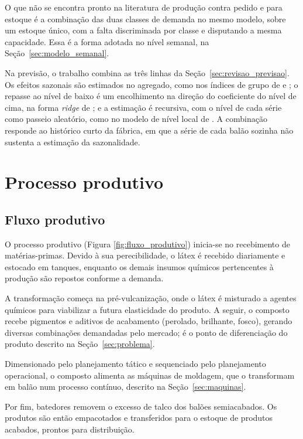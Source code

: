 \documentclass[
    12pt,
    openright,
    oneside,
    a4paper,
    fleqn,
    chapter=TITLE,
    section=TITLE,
    english,
    brazil
]{abntex2}
\begin{document}
O que não se encontra pronto na literatura de produção contra pedido e para estoque é a combinação das duas classes de demanda no mesmo modelo, sobre um estoque único, com a falta discriminada por classe e disputando a mesma capacidade. Essa é a forma adotada no nível semanal, na Seção~\ref{sec:modelo_semanal}.

Na previsão, o trabalho combina as três linhas da Seção~\ref{sec:revisao_previsao}. Os efeitos sazonais são estimados no agregado, como nos índices de grupo de  e ; o repasse ao nível de baixo é um encolhimento na direção do coeficiente do nível de cima, na forma \textit{ridge} de ; e a estimação é recursiva, com o nível de cada série como passeio aleatório, como no modelo de nível local de . A combinação responde ao histórico curto da fábrica, em que a série de cada balão sozinha não sustenta a estimação da sazonalidade.


\chapter{Processo produtivo}
\label{sec:processo}

\section{Fluxo produtivo}
\label{sec:fluxo}

O processo produtivo (Figura \ref{fig:fluxo_produtivo}) inicia-se no recebimento de matérias-primas. Devido à sua perecibilidade, o látex é recebido diariamente e estocado em tanques, enquanto os demais insumos químicos pertencentes à produção são repostos conforme a demanda.

A transformação começa na pré-vulcanização, onde o látex é misturado a agentes químicos para viabilizar a futura elasticidade do produto. A seguir, o composto recebe pigmentos e aditivos de acabamento (perolado, brilhante, fosco), gerando diversas combinações demandadas pelo mercado; é o ponto de diferenciação do produto descrito na Seção~\ref{sec:problema}.

Dimensionado pelo planejamento tático e sequenciado pelo planejamento operacional, o composto alimenta as máquinas de moldagem, que o transformam em balão num processo contínuo, descrito na Seção~\ref{sec:maquinas}.

Por fim, batedores removem o excesso de talco dos balões semiacabados. Os produtos são então empacotados e transferidos para o estoque de produtos acabados, prontos para distribuição.
\end{document}
